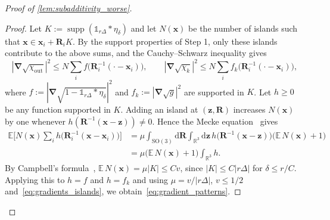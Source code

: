 \documentclass[final,reqno]{amsart}
\theoremstyle{remark}
\renewcommand{\le}{\leqslant}
\renewcommand{\ge}{\geqslant}
\DeclareMathOperator{\supp}{supp}
\newcommand{\RR}{\mathbb{R}}
\newcommand{\EE}{\mathbb{E}}
\newcommand{\SO}{\mathrm{SO}}
\newcommand{\iden}{\mathbb{1}}
\newcommand{\grad}{\bm{\nabla}}
\newcommand{\tetra}{\mathbb{\Delta}}
\newcommand{\dd}{\mathrm{d}}
\begin{document}
\begin{proof}[Proof of \cref{lem:subadditivity_worse}]
\begin{proof}
Let $K:=\supp(\iden_{r\tetra}\ast\eta_\delta)$ and let $N(\mathbf{x})$ be the number of islands such that $\mathbf{x}\in\mathbf{x}_i+\mathbf{R}_iK$. By the support properties of Step 1, only these islands contribute to the above sums, and the Cauchy--Schwarz inequality gives
$$
|\grad\sqrt{\chi_{\mathrm{out}}}|^2\le N\sum_if\big(\mathbf{R}_i^{-1}(\cdot-\mathbf{x}_i)\big),\qquad |\grad\sqrt{\chi_k}|^2\le N\sum_if_k\big(\mathbf{R}_i^{-1}(\cdot-\mathbf{x}_i)\big),
$$
where $f:=|\grad\sqrt{1-\iden_{r\tetra}\ast\eta_\delta}|^2$ and $f_k:=|\grad\sqrt{g}|^2$ are supported in $K$. Let $h\ge0$ be any function supported in $K$. Adding an island at $(\mathbf{z},\mathbf{R})$ increases $N(\mathbf{x})$ by one whenever $h(\mathbf{R}^{-1}(\mathbf{x}-\mathbf{z}))\neq0$. Hence the Mecke equation~\cite{last2017lectures} gives
\begin{align*}
\EE\Big[N(\mathbf{x})\sum_ih\big(\mathbf{R}_i^{-1}(\mathbf{x}-\mathbf{x}_i)\big)\Big]&=\mu\int_{\SO(3)}\dd\mathbf{R}\int_{\RR^3}\dd\mathbf{z}\,h\big(\mathbf{R}^{-1}(\mathbf{x}-\mathbf{z})\big)\big(\EE\,N(\mathbf{x})+1\big)\\
&=\mu\big(\EE\,N(\mathbf{x})+1\big)\int_{\RR^3}h.
\end{align*}
By Campbell's formula~\cite{last2017lectures}, $\EE\,N(\mathbf{x})=\mu|K|\le Cv$, since $|K|\le C|r\tetra|$ for $\delta\le r/C$. Applying this to $h=f$ and $h=f_k$ and using $\mu=v/|r\tetra|$, $v\le1/2$ and~\cref{eq:gradients_islands}, we obtain~\cref{eq:gradient_patterns}.
\end{proof}

\medskip


\end{proof}
\end{document}
